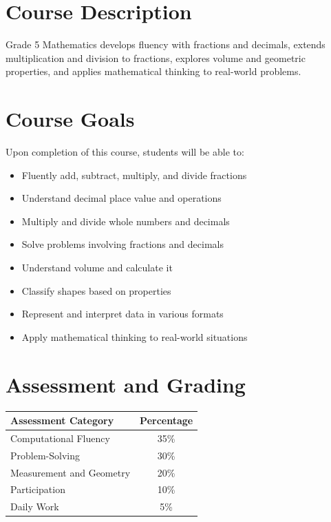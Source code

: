 \documentclass[11pt,letterpaper]{report}
\begin{document}
\section{Course Description}

Grade 5 Mathematics develops fluency with fractions and decimals, extends multiplication and division to fractions, explores volume and geometric properties, and applies mathematical thinking to real-world problems.

\section{Course Goals}

Upon completion of this course, students will be able to:

\begin{itemize}
    \item Fluently add, subtract, multiply, and divide fractions
    \item Understand decimal place value and operations
    \item Multiply and divide whole numbers and decimals
    \item Solve problems involving fractions and decimals
    \item Understand volume and calculate it
    \item Classify shapes based on properties
    \item Represent and interpret data in various formats
    \item Apply mathematical thinking to real-world situations
\end{itemize}

\section{Assessment and Grading}

\begin{center}
\begin{tabular}{|l|c|}
\hline
\textbf{Assessment Category} & \textbf{Percentage} \\
\hline
Computational Fluency & 35\% \\
\hline
Problem-Solving & 30\% \\
\hline
Measurement and Geometry & 20\% \\
\hline
Participation & 10\% \\
\hline
Daily Work & 5\% \\
\hline
\end{tabular}
\end{center}
\end{document}
